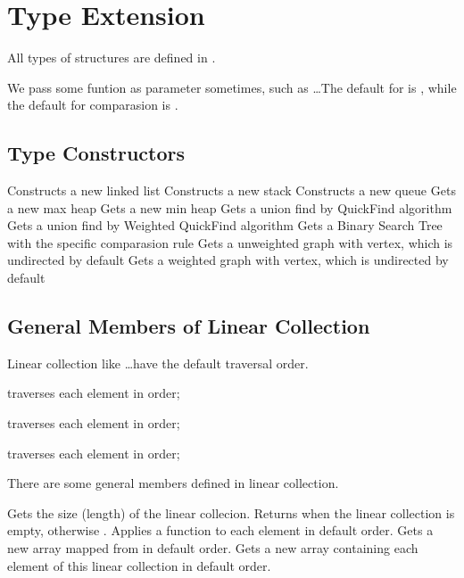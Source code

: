 \section{Type Extension}
All types of structures are defined in .

We pass some funtion as parameter sometimes, such as  \ldots The default  for  is , while the default for comparasion is .

\subsection{Type Constructors}
Constructs a new linked list
Constructs a new stack
Constructs a new queue
Gets a new max heap
Gets a new min heap
Gets a union find by QuickFind algorithm
Gets a union find by Weighted QuickFind algorithm
Gets a Binary Search Tree with the specific comparasion rule
Gets a unweighted graph with  vertex, which is undirected by default
Gets a weighted graph with  vertex, which is undirected by default

\subsection{General Members of Linear Collection}
Linear collection like  \ldots have the default traversal order. 

 traverses each element in  order;

 traverses each element in  order;

 traverses each element in  order;

There are some general members defined in linear collection. 

Gets the size (length) of the linear collecion.
Returns  when the linear collection is empty, otherwise .
Applies a function to each element in default order.
Gets a new array mapped from  in default order.
Gets a new array containing each element of this linear collection in default order.

